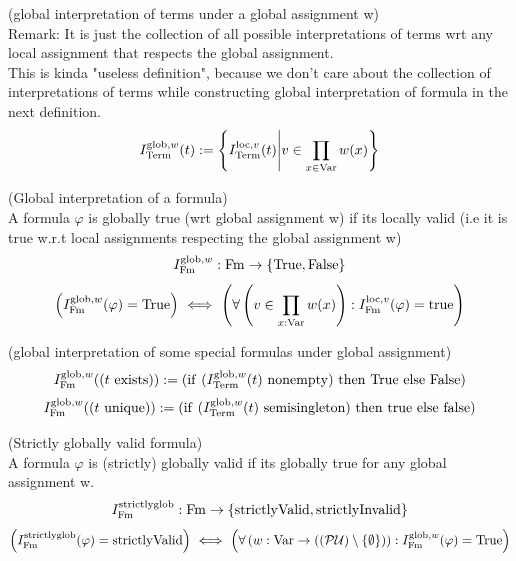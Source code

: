 \begin{definition}(global interpretation of terms under a global assignment w)\\
Remark: It is just the collection of all possible interpretations of terms wrt any local assignment that respects the global assignment.\\
This is kinda "useless definition", because we don't care about the collection of interpretations of terms while constructing global interpretation of formula in the next definition.
\[
I^{\mathrm{glob},w}_{\mathrm{Term}}(t) := \left\{I^{\mathrm{loc},v}_{\mathrm{Term}}(t) \middle| v\in \prod_{x\in\mathrm{Var}}w(x) \right\}
\]
\end{definition}
\begin{definition}(Global interpretation of a formula)\\
A formula $\varphi$ is globally true (wrt global assignment w) if its locally valid (i.e it is true w.r.t local assignments respecting the global assignment w)
\[
I^{\mathrm{glob},w}_{\mathrm{Fm}} : \mathrm{Fm} \to \{\mathrm{True}, \mathrm{False}\}
\]
\[
\left(I^{\mathrm{glob},w}_{\mathrm{Fm}}(\varphi)=\mathrm{True}\right) \ \Longleftrightarrow\  \left(\forall \left(v\in\prod_{x:\mathrm{Var}}w(x)\right):I^{\mathrm{loc},v}_{\mathrm{Fm}}(\varphi)=\mathrm{true}\right)
\]
\end{definition}
\begin{example}(global interpretation of some special formulas under global assignment)
\[
I^{\glob,w}_\Fm((t\lexists)) := (\lif\ (I^{\glob,w}_\Term(t)\nonempty)\ \lthen\ \lTrue\ \lelse\ \lFalse)
\]
\[
I^{\glob,w}_\Fm((t\lunique)) := (\lif\ (I^{\glob,w}_\Term(t)\mbox{ semisingleton})\ \lthen\ \ltrue\ \lelse\ \lfalse)
\]
\end{example}
\begin{definition}(Strictly globally valid formula)\\%
A formula $\varphi$ is (strictly) globally valid if its globally true for any global assignment w.
\[
I^{\mathrm{strictly}\mathrm{glob}}_{\mathrm{Fm}} : \mathrm{Fm} \to \{\mathrm{strictly}\mathrm{Valid},\mathrm{strictly}\mathrm{Invalid}\}
\]
\[
\left(I^{\mathrm{strictly}\mathrm{glob}}_{\mathrm{Fm}}(\varphi)=\mathrm{strictly}\mathrm{Valid}\right) \ \Longleftrightarrow\ 
 \left(\forall \left(w:\mathrm{Var}\to((\mathcal{P}\mathcal{U})\setminus\{\emptyset\})\right):I^{\mathrm{glob},w}_{\mathrm{Fm}}(\varphi)=\mathrm{True}\right)
\]
\end{definition}
